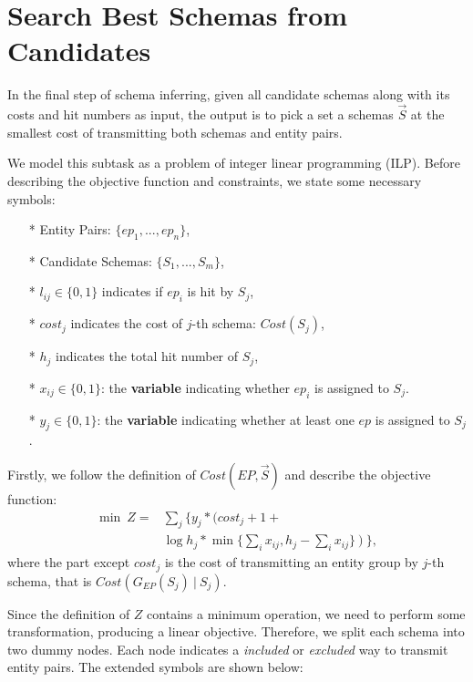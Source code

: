 \section{Search Best Schemas from Candidates}

In the final step of schema inferring, given all candidate schemas along with its costs and hit numbers
as input, the output is to pick a set a schemas $\vec{S}$ at the smallest cost of transmitting both
schemas and entity pairs.



We model this subtask as a problem of integer linear programming (ILP).
Before describing the objective function and constraints, 
we state some necessary symbols:

\begin{itemize}
  \item[*] Entity Pairs: $\{ep_1, ..., ep_n\}$,
  \item[*] Candidate Schemas: $\{S_1, ..., S_m\}$,
  \item[*] $l_{ij} \in \{0, 1\}$ indicates if $ep_i$ is hit by $S_j$,
  \item[*] $cost_j$ indicates the cost of $j$-th schema: $Cost(S_j)$,
  \item[*] $h_j$ indicates the total hit number of $S_j$,
  \item[*] $x_{ij} \in \{0, 1\}$: the \textbf{variable} indicating whether
  $ep_i$ is assigned to $S_j$.
  \item[*] $y_j \in \{0, 1\}$: the \textbf{variable} indicating whether
  at least one $ep$ is assigned to $S_j$.
\end{itemize}
Firstly, we follow the definition of $Cost(EP, \vec{S})$ and describe the
objective function:
\begin{equation}
\begin{aligned}
  \min ~ Z = & \sum\nolimits_j \{ y_j * (cost_j + 1 + \\
             & \log h_j * \min \{\sum\nolimits_i x_{ij}, h_j - \sum\nolimits_i x_{ij} \}~ )~ \},
\end{aligned}
\end{equation}
where the part except $cost_j$ is the cost of transmitting an entity group
by $j$-th schema, that is $Cost(G_{EP}(S_j)~ |~ S_j)$.

Since the definition of $Z$ contains a minimum operation, 
we need to perform some transformation, producing a linear objective.
Therefore, we split each schema into two dummy nodes. Each node indicates
a \textit{included} or \textit{excluded} way to transmit entity pairs.
The extended symbols are shown below:

